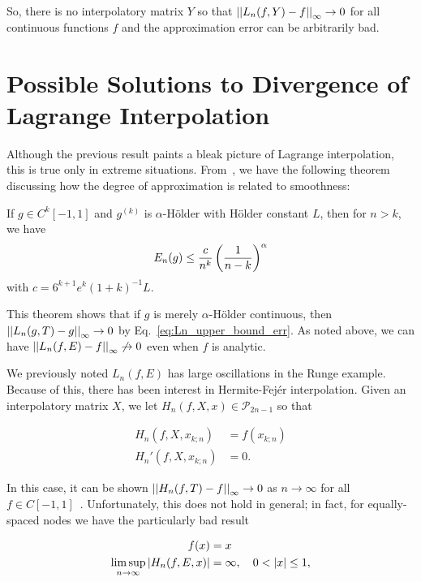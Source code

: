 \noindent
So, there is no interpolatory matrix $Y$ so that
$\left| \left| L_{n}(f,Y)-f \right| \right|_{\infty}\to0$ for all continuous functions $f$
and the approximation error can be arbitrarily bad.



\section{Possible Solutions to Divergence of Lagrange Interpolation}
\label{sec:poss_lagrange_sol}

Although the previous result paints a bleak picture of Lagrange interpolation,
this is true only in extreme situations.
From~\cite[Chapter 1]{rivlin2003introduction}, we have the following theorem
discussing how the degree of approximation is related to smoothness:

\begin{thm}
\label{thm:best_uni_err}
If $g\in C^{k}[-1,1]$ and $g^{(k)}$ is $\alpha$-H\"{o}lder
with H\"{o}lder constant $L$, then for $n>k$, we have
%
\begin{equation}
    E_{n}(g) \le \frac{c}{n^{k}}\left( \frac{1}{n-k} \right)^{\alpha}
\end{equation}
%
with $c=6^{k+1}e^{k}(1+k)^{-1}L$.
\end{thm}

\noindent This theorem shows that if $g$ is merely $\alpha$-H\"{o}lder
continuous, then $\left| \left| L_{n}(g,T)-g \right| \right|_{\infty}\to0$ by
Eq.~\eqref{eq:Ln_upper_bound_err}.
As noted above, we can have $\left| \left| L_{n}(f,E)-f \right| \right|_{\infty}\not\to0$
even when $f$ is analytic.

We previously noted $L_{n}(f,E)$ has large oscillations in the Runge example.
Because of this, there has been interest in Hermite-Fej\'{e}r interpolation.
Given an interpolatory matrix $X$, we let $H_{n}(f,X,x)\in\mathcal{P}_{2n-1}$
so that

\begin{align}
    H_{n}(f,X,x_{k;n}) &= f(x_{k;n}) \nonumber\\
    H_{n}'(f,X,x_{k;n}) &= 0.
\end{align}

\noindent
In this case, it can be shown $\left| \left| H_{n}(f,T)-f \right| \right|_{\infty}\to0$
as $n\to\infty$ for all $f\in C[-1,1]$~\cite[Chapter 5]{interpFunctionsBook}.
Unfortunately, this does not hold in general; in fact,
for equally-spaced nodes we have the particularly bad
result

\begin{align}
    f(x) &= x \nonumber\\
    \limsup_{n\to\infty} \left| H_{n}(f,E,x) \right| &= \infty,\quad 0 <\left| x \right|\le1,
\end{align}

